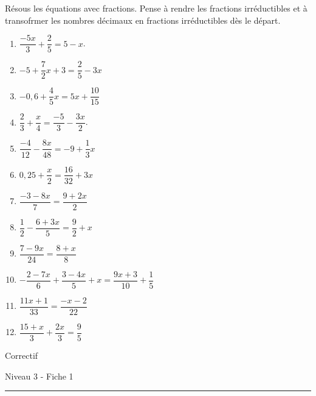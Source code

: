 \documentclass[12pt,parskip=half-, twoside=semi]{scrartcl}
\begin{document}
\begin{exercise}
  Résous les équations avec fractions. Pense à rendre les fractions irréductibles et à transofrmer les nombres décimaux en fractions irréductibles dès le départ.
  \begin{enumerate} [itemsep=0.4cm]   
      \item $\dfrac{-5 x}{3}+\dfrac{2}{5}=5-x$.
      \item $-5+\dfrac{7}{2} x+3=\dfrac{2}{5}-3 x$
      \item $-0,6+\dfrac{4}{5} x=5 x+\dfrac{10}{15}$
      \item $\dfrac{2}{3}+\dfrac{x}{4}=\dfrac{-5}{3}-\dfrac{3 x}{2}$.
      \item $\dfrac{-4}{12}-\dfrac{8 x}{48}=-9+\dfrac{1}{3} x$
      \item $0,25+\dfrac{x}{2}=\dfrac{16}{32}+3 x$
      \item $\dfrac{-3-8 x}{7}=\dfrac{9+2 x}{2}$
      \item $\dfrac{1}{2}-\dfrac{6+3 x}{5}=\dfrac{9}{2}+x$
      \item $\dfrac{7-9 x}{24}=\dfrac{8+x}{8}$
      \item $-\dfrac{2-7 x}{6}+\dfrac{3-4 x}{5}+x=\dfrac{9 x+3}{10}+\dfrac{1}{5}$
      \item $\dfrac{11 x+1}{33}=\dfrac{-x-2}{22}$
      \item $\dfrac{15+x}{3}+\dfrac{2 x}{3}=\dfrac{9}{5}$ 
  \end{enumerate}
\end{exercise}

\newpage


  \begin{center}
    \bfseries
    \begin{Huge}
      Correctif
    \end{Huge}
    \smallbreak
    \begin{large}
      Niveau 3  - Fiche 1
    \end{large}
    \smallbreak
    \rule[10pt]{.5\linewidth}{1 pt}
  \end{center}
  \setcounter{exercise}{0}
\end{document}
